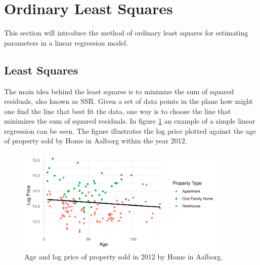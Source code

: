 \newpage
\section{Ordinary Least Squares}
This section will introduce the method of ordinary least squares for estimating parameters in a linear regression model.

\subsection{Least Squares}
The main idea behind the least squares is to minimize the sum of squared residuals, also known as SSR. 
Given a set of data points in the plane how might one find the line that best fit the data, one way is to choose the line that minimizes the sum of squared residuals.
In figure \ref{fig:example_simple_linear_regression} an example of a simple linear regression can be seen. 
The figure illustrates the log price plotted against the age of property sold by Home in Aalborg within the year 2012.
\begin{figure}[h]
    \centering
    \includegraphics[width = 0.9\textwidth]{figures/Ordinary_Least_Squares/example_linear_regression.pdf}
    \caption{Age and log price of property sold in 2012 by Home in Aalborg.}
    \label{fig:example_simple_linear_regression}
\end{figure}

